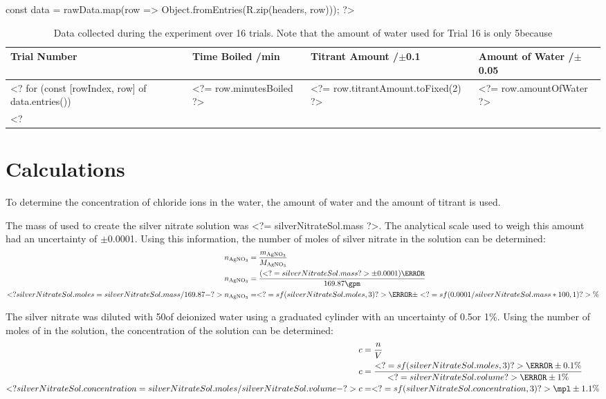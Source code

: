 \documentclass[11pt]{article}
\begin{document}
const data = rawData.map(row => Object.fromEntries(R.zip(headers, row)));
?>

\begin{table}[H]
	\caption{Data collected during the experiment over 16 trials. Note that the amount of water used for Trial 16 is only 5\ml because }
	\def\arraystretch{1.5}
	\begin{tabularx}{\linewidth}{|
			>{\RaggedRight}X|
			>{\RaggedRight}X|
			>{\RaggedRight}X|
			>{\RaggedRight}X|
		}
		\hline
		\textbf{Trial Number}                &
		\textbf{Time Boiled} /\si{\minute}   &
		\textbf{Titrant Amount} /$\pm$0.1\ml &
		\textbf{Amount of Water} /$\pm$0.05\ml
		\\\hline
		<? for (const [rowIndex, row] of data.entries()) { ?>
			Trial <?= rowIndex + 1 ?>
			& <?= row.minutesBoiled ?>
			& <?= row.titrantAmount.toFixed(2) ?>
			& <?= row.amountOfWater ?>
			\\\hline
		<? } ?>
	\end{tabularx}
\end{table}

\section{Calculations}

To determine the concentration of chloride ions in the water, the amount of water and the amount of titrant is used.

The mass of  used to create the silver nitrate solution was <?= silverNitrateSol.mass ?>\g. The analytical scale used to weigh this amount had an uncertainty of $\pm$0.0001\g. Using this information, the number of moles of silver nitrate in the solution can be determined:
%
\begin{align*}
	n_{\ce{AgNO3}} & = \frac{m_{\ce{AgNO3}}}{M_{\ce{AgNO3}}}
	\\
	n_{\ce{AgNO3}} & = \frac{(<?= silverNitrateSol.mass ?> \pm 0.0001)\g}{169.87\gpm}
	\\
	<? silverNitrateSol.moles = silverNitrateSol.mass / 169.87 -?>
	n_{\ce{AgNO3}} & = <?= sf(silverNitrateSol.moles, 3) ?>\mol \pm <?= sf(0.0001 / silverNitrateSol.mass * 100, 1) ?>\%
\end{align*}

The silver nitrate was diluted with 50\ml of deionized water using a graduated cylinder with an uncertainty of 0.5\ml or 1\%. Using the number of moles of  in the solution, the concentration of the solution can be determined:
%
\begin{align*}
	c & = \frac{n}{V}
	\\
	c & = \frac{<?= sf(silverNitrateSol.moles, 3) ?>\mol \pm 0.1\%}{<?= silverNitrateSol.volume ?>\litre \pm 1\%}
	\\
	<? silverNitrateSol.concentration = silverNitrateSol.moles / silverNitrateSol.volume -?>
	c & = <?= sf(silverNitrateSol.concentration, 3) ?>\mpl \pm 1.1\%
\end{align*}
\end{document}
